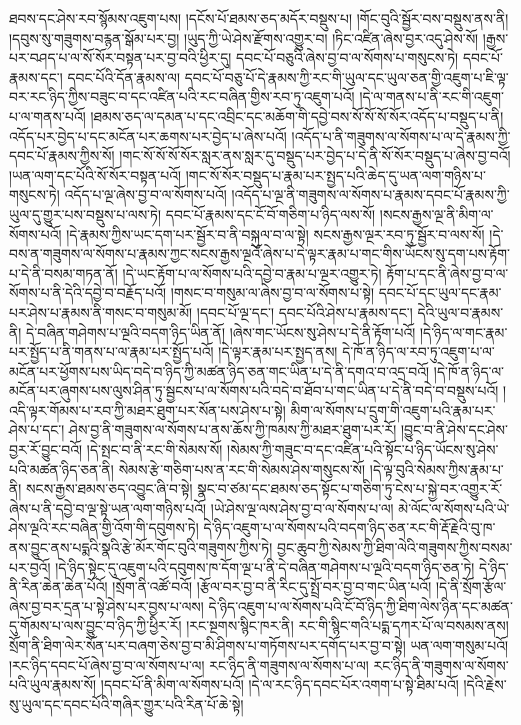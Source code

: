 ཐབས་དང་ཤེས་རབ་སྙོམས་འཇུག་པས། །དངོས་པོ་ཐམས་ཅད་མདོར་བསྡུས་པ། །གོང་བུའི་སྦྱོར་བས་བསྡུས་ནས་ནི། །དབུས་སུ་གཟུགས་བརྙན་སྒོམ་པར་བྱ། །ཡུད་ཀྱི་ཡེ་ཤེས་རྫོགས་འགྱུར་བ། །ཏིང་འཛིན་ཞེས་བྱར་འདུ་ཤེས་སོ། །རྒྱས་པར་བཤད་པ་ལ་སོ་སོར་བསྟན་པར་བྱ་བའི་ཕྱིར་དུ། དབང་པོ་བཅུའི་ཞེས་བྱ་བ་ལ་སོགས་པ་གསུངས་ཏེ། དབང་པོ་རྣམས་དང་། དབང་པོའི་དོན་རྣམས་ལ། དབང་པོ་བཅུ་པོ་དེ་རྣམས་ཀྱི་རང་གི་ཡུལ་དང་ཡུལ་ཅན་གྱི་འཇུག་པ་ཇི་ལྟ་བར་རང་ཉིད་ཀྱིས་བཟུང་བ་དང་འཛིན་པའི་རང་བཞིན་གྱིས་རབ་ཏུ་འཇུག་པའོ། །དེ་ལ་གནས་པ་ནི་རང་གི་འཇུག་པ་ལ་གནས་པའོ། །ཐམས་ཅད་ལ་དམན་པ་དང་འབྲིང་དང་མཆོག་གི་དབྱེ་བས་སོ་སོ་སོ་སོར་འདོད་པ་བསྡུད་པ་ནི། འདོད་པར་བྱེད་པ་དང་མངོན་པར་ཆགས་པར་བྱེད་པ་ཞེས་པའོ། །འདོད་པ་ནི་གཟུགས་ལ་སོགས་པ་ལ་དེ་རྣམས་ཀྱི་དབང་པོ་རྣམས་ཀྱིས་སོ། །གང་སོ་སོ་སོ་སོར་སླར་ནས་སླར་དུ་བསྡུད་པར་བྱེད་པ་དེ་ནི་སོ་སོར་བསྡུད་པ་ཞེས་བྱ་བའོ། །ཡན་ལག་དང་པོའི་སོ་སོར་བསྟན་པའོ། །གང་སོ་སོར་བསྡུད་པ་རྣམ་པར་སྤྱད་པའི་ཆེད་དུ་ཡན་ལག་གཉིས་པ་གསུངས་ཏེ། འདོད་པ་ལྔ་ཞེས་བྱ་བ་ལ་སོགས་པའོ། །འདོད་པ་ལྔ་ནི་གཟུགས་ལ་སོགས་པ་རྣམས་དབང་པོ་རྣམས་ཀྱི་ཡུལ་དུ་གྱུར་པས་བསྡུས་པ་ལས་ཏེ། དབང་པོ་རྣམས་དང་ངོ་བོ་གཅིག་པ་ཉིད་ལས་སོ། །སངས་རྒྱས་ལྔ་ནི་མིག་ལ་སོགས་པའོ། །དེ་རྣམས་ཀྱིས་ཡང་དག་པར་སྦྱོར་བ་ནི་བསྐུལ་བ་ལ་སྟེ། སངས་རྒྱས་ལྔར་རབ་ཏུ་སྦྱོར་བ་ལས་སོ། །དེ་བས་ན་གཟུགས་ལ་སོགས་པ་རྣམས་ཀྱང་སངས་རྒྱས་ལྔའོ་ཞེས་པ་དེ་ལྟར་རྣམ་པ་གང་གིས་ཡོངས་སུ་དག་པས་རྟོག་པ་དེ་ནི་བསམ་གཏན་ནོ། །དེ་ཡང་རྟོག་པ་ལ་སོགས་པའི་དབྱེ་བ་རྣམ་པ་ལྔར་འགྱུར་ཏེ། རྟོག་པ་དང་ནི་ཞེས་བྱ་བ་ལ་སོགས་པ་ནི་དེའི་དབྱེ་བ་བརྗོད་པའོ། །གསང་བ་གསུམ་ལ་ཞེས་བྱ་བ་ལ་སོགས་པ་སྟེ། དབང་པོ་དང་ཡུལ་དང་རྣམ་པར་ཤེས་པ་རྣམས་ནི་གསང་བ་གསུམ་མོ། །དབང་པོ་ལྔ་དང་། དབང་པོའི་ཤེས་པ་རྣམས་དང་། དེའི་ཡུལ་བ་རྣམས་ནི། དེ་བཞིན་གཤེགས་པ་ལྔའི་བདག་ཉིད་ཡིན་ནོ། །ཞེས་གང་ཡོངས་སུ་ཤེས་པ་དེ་ནི་རྟོག་པའོ། །དེ་ཉིད་ལ་གང་རྣམ་པར་སྤྱོད་པ་ནི་གནས་པ་ལ་རྣམ་པར་སྤྱོད་པའོ། །དེ་ལྟར་རྣམ་པར་སྤྱད་ནས། དེ་ཁོ་ན་ཉིད་ལ་རབ་ཏུ་འཇུག་པ་ལ་མངོན་པར་ཕྱོགས་པས་ཡིད་བདེ་བ་ཉིད་ཀྱི་མཚན་ཉིད་ཅན་གང་ཡིན་པ་དེ་ནི་དགའ་བ་འདྲ་བའོ། །དེ་ཁོ་ན་ཉིད་ལ་མངོན་པར་ཞུགས་པས་ལུས་ཤིན་ཏུ་སྦྱངས་པ་ལ་སོགས་པའི་བདེ་བ་ཐོབ་པ་གང་ཡིན་པ་དེ་ནི་བདེ་བ་བསྡུས་པའོ། །འདི་ལྟར་གོམས་པ་རབ་ཀྱི་མཐར་ཐུག་པར་སོན་པས་ཤེས་པ་སྟེ། མིག་ལ་སོགས་པ་དྲུག་གི་འཇུག་པའི་རྣམ་པར་ཤེས་པ་དང་། ཤེས་བྱ་ནི་གཟུགས་ལ་སོགས་པ་ནས་ཆོས་ཀྱི་ཁམས་ཀྱི་མཐར་ཐུག་པར་རོ། །བྱུང་བ་ནི་ཤེས་དང་ཤེས་བྱར་རོ་བྱུང་བའོ། །དེ་སྤང་བ་ནི་རང་གི་སེམས་སོ། །སེམས་ཀྱི་གཟུང་བ་དང་འཛིན་པའི་སྟོང་པ་ཉིད་ཡོངས་སུ་ཤེས་པའི་མཚན་ཉིད་ཅན་ནི། སེམས་རྩེ་གཅིག་པས་ན་རང་གི་སེམས་ཤེས་གསུངས་སོ། །དེ་ལྟ་བུའི་སེམས་ཀྱིས་རྣམ་པ་ནི། སངས་རྒྱས་ཐམས་ཅད་འབྱུང་ཞི་བ་སྟེ། སྣང་བ་ཙམ་དང་ཐམས་ཅད་སྟོང་པ་གཅིག་ཏུ་ངེས་པ་སྐྱེ་བར་འགྱུར་རོ་ཞེས་པ་ནི་དབྱེ་བ་ལྔ་སྟེ་ཡན་ལག་གཉིས་པའོ། །ཡེ་ཤེས་ལྔ་ལས་ཤེས་བྱ་བ་ལ་སོགས་པ་ལ། མེ་ལོང་ལ་སོགས་པའི་ཡེ་ཤེས་ལྔའི་རང་བཞིན་གྱི་འོག་གི་དབུགས་ཏེ། དེ་ཉིད་འཇུག་པ་ལ་སོགས་པའི་བདག་ཉིད་ཅན་རང་གི་རྡོ་རྗེའི་བུ་ཁ་ནས་བྱུང་ནས་པདྨའི་སྣའི་རྩེ་མོར་གོང་བུའི་གཟུགས་ཀྱིས་ཏེ། བྱང་ཆུབ་ཀྱི་སེམས་ཀྱི་ཐིག་ལེའི་གཟུགས་ཀྱིས་བསམ་པར་བྱའོ། །དེ་ཉིད་སྟེང་དུ་འཇུག་པའི་དབུགས་ཁ་དོག་ལྔ་པ་ནི་དེ་བཞིན་གཤེགས་པ་ལྔའི་བདག་ཉིད་ཅན་ཏེ། དེ་ཉིད་ནི་རིན་ཆེན་ཆེན་པོའོ། །སྲོག་ནི་འཚོ་བའོ། །རྩོལ་བར་བྱ་བ་ནི་རིང་དུ་སྤྲོ་བར་བྱ་བ་གང་ཡིན་པའོ། །དེ་ནི་སྲོག་རྩོལ་ཞེས་བྱ་བར་དྲན་པ་སྟེ་ཤེས་པར་བྱས་པ་ལས། དེ་ཉིད་འཇུག་པ་ལ་སོགས་པའི་ངོ་བོ་ཉིད་ཀྱི་ཐིག་ལེས་ཉིན་དང་མཚན་དུ་གོམས་པ་ལས་བྱུང་བ་ཉིད་ཀྱི་ཕྱིར་རོ། །རང་སྔགས་སྙིང་ཁར་ནི། རང་གི་སྙིང་གའི་པདྨ་དཀར་པོ་ལ་བསམས་ནས། སྲོག་ནི་ཐིག་ལེར་སོན་པར་བཞག་ཅེས་བྱ་བ་མི་ཤིགས་པ་གཏོགས་པར་དགོད་པར་བྱ་བ་སྟེ། ཡན་ལག་གསུམ་པའོ། །རང་ཉིད་དབང་པོ་ཞེས་བྱ་བ་ལ་སོགས་པ་ལ། རང་ཉིད་ནི་གཟུགས་ལ་སོགས་པ་ལ། རང་ཉིད་ནི་གཟུགས་ལ་སོགས་པའི་ཡུལ་རྣམས་སོ། །དབང་པོ་ནི་མིག་ལ་སོགས་པའོ། །དེ་ལ་རང་ཉིད་དབང་པོར་འགག་པ་སྟེ་ཐིམ་པའོ། །དེའི་རྗེས་སུ་ཡུལ་དང་དབང་པོའི་གཞིར་གྱུར་པའི་རིན་པོ་ཆེ་སྟེ། 